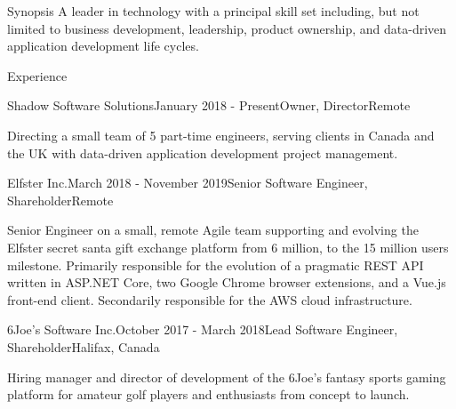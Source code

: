 \documentclass{resume} %
\begin{document}
\begin{rSection}{Synopsis}
A leader in technology with a principal skill set including, but not limited to business development, leadership, product ownership, and data-driven application development life cycles.
\end{rSection}


\begin{rSection}{Experience}

\begin{rSubsection}{Shadow Software Solutions}{January 2018 - Present}{Owner, Director}{Remote}

\item[] Directing a small team of 5 part-time engineers, serving clients in Canada and the UK with data-driven application development project management.

\end{rSubsection}


\begin{rSubsection}{Elfster Inc.}{March 2018 - November 2019}{Senior Software Engineer, Shareholder}{Remote}

\item[] Senior Engineer on a small, remote Agile team supporting and evolving the Elfster secret santa gift exchange platform from 6 million, to the 15 million users milestone. Primarily responsible for the evolution of a pragmatic REST API written in ASP.NET Core, two Google Chrome browser extensions, and a Vue.js front-end client. Secondarily responsible for the AWS cloud infrastructure.

\end{rSubsection}


\begin{rSubsection}{6Joe's Software Inc.}{October 2017 - March 2018}{Lead Software Engineer, Shareholder}{Halifax, Canada}

\item[] Hiring manager and director of development of the 6Joe's fantasy sports gaming platform for amateur golf players and enthusiasts from concept to launch.


\end{rSubsection}
\end{rSection}
\end{document}
